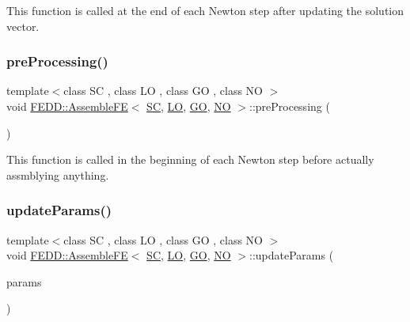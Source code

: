 This function is called at the end of each Newton step after updating the solution vector. 

\mbox{\label{classFEDD_1_1AssembleFE_a7bfb3f6b49f102b0856551d62c8c8a9f}} 
\subsubsection{\texorpdfstring{pre\+Processing()}{preProcessing()}}
{\footnotesize\ttfamily template$<$class SC , class LO , class GO , class NO $>$ \\
void \hyperlink{classFEDD_1_1AssembleFE}{F\+E\+D\+D\+::\+Assemble\+FE}$<$ \hyperlink{fe__test__laplace_8cpp_a79c7e86a57edbb2a5a53242bcd04e41e}{SC}, \hyperlink{fe__test__laplace_8cpp_ad6a38c9f07d3fd633eefca5bccad8410}{LO}, \hyperlink{fe__test__laplace_8cpp_afa2946b509009b4f45eb04bd8c5b27d9}{GO}, \hyperlink{fe__test__laplace_8cpp_a5e24f37b28787429872b6ecb1d0417ce}{NO} $>$\+::pre\+Processing (\begin{DoxyParamCaption}{ }\end{DoxyParamCaption})}



This function is called in the beginning of each Newton step before actually assmblying anything. 

\mbox{\label{classFEDD_1_1AssembleFE_a48ea6d9259f538a88fa5b21667869bce}} 
\subsubsection{\texorpdfstring{update\+Params()}{updateParams()}}
{\footnotesize\ttfamily template$<$class SC , class LO , class GO , class NO $>$ \\
void \hyperlink{classFEDD_1_1AssembleFE}{F\+E\+D\+D\+::\+Assemble\+FE}$<$ \hyperlink{fe__test__laplace_8cpp_a79c7e86a57edbb2a5a53242bcd04e41e}{SC}, \hyperlink{fe__test__laplace_8cpp_ad6a38c9f07d3fd633eefca5bccad8410}{LO}, \hyperlink{fe__test__laplace_8cpp_afa2946b509009b4f45eb04bd8c5b27d9}{GO}, \hyperlink{fe__test__laplace_8cpp_a5e24f37b28787429872b6ecb1d0417ce}{NO} $>$\+::update\+Params (\begin{DoxyParamCaption}\item[{Parameter\+List\+Ptr\+\_\+\+Type}]{params }\end{DoxyParamCaption})\hspace{0.3cm}{\ttfamily [virtual]}}




